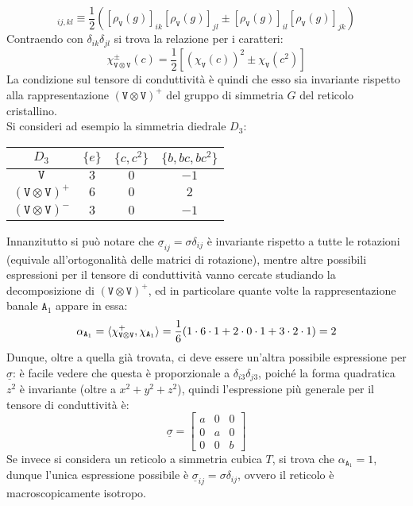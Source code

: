 \begin{equation}
	[\rho_{\mathtt{V} \otimes \mathtt{V}}^{\pm}(g)]_{ij,kl} \equiv \frac{1}{2} \left( [\rho_{\mathtt{V}}(g)]_{ik} [\rho_{\mathtt{V}}(g)]_{jl} \pm [\rho_{\mathtt{V}}(g)]_{il} [\rho_{\mathtt{V}}(g)]_{jk} \right)
	\label{eq:8.35}
\end{equation}
Contraendo con $ \delta_{ik} \delta_{jl} $ si trova la relazione per i caratteri:
\begin{equation}
	\chi_{\mathtt{V} \otimes \mathtt{V}}^{\pm}(c) = \frac{1}{2} \left[ (\chi_{\mathtt{V}}(c))^2 \pm \chi_{\mathtt{V}}(c^2) \right]
	\label{eq:8.36}
\end{equation}
La condizione sul tensore di conduttività è quindi che esso sia invariante rispetto alla rappresentazione $ (\mathtt{V} \otimes \mathtt{V})^+ $ del gruppo di simmetria $ G $ del reticolo cristallino.\\
Si consideri ad esempio la simmetria diedrale $ D_3 $:

\begin{table}[H]
	\centering
	\begin{tabular}{c|ccc}
		$ D_3 $ & $ \{e\} $ & $ \{c,c^2\} $ & $ \{b,bc,bc^2\} $ \\
		\hline
		$ \mathtt{V} $ & $ 3 $ & $ 0 $ & $ -1 $ \\
		$ \left( \mathtt{V} \otimes \mathtt{V} \right)^+ $ & $ 6 $ & $ 0 $ & $ 2 $ \\
		$ \left( \mathtt{V} \otimes \mathtt{V} \right)^- $ & $ 3 $ & $ 0 $ & $ -1 $
	\end{tabular}
\end{table}
Innanzitutto si può notare che $ \underline{\sigma}_{ij} = \sigma \delta_{ij} $ è invariante rispetto a tutte le rotazioni (equivale all'ortogonalità delle matrici di rotazione), mentre altre possibili espressioni per il tensore di conduttività vanno cercate studiando la decomposizione di $ \left( \mathtt{V} \otimes \mathtt{V} \right)^+ $, ed in particolare quante volte la rappresentazione banale $ \mathtt{A}_1 $ appare in essa:
\begin{equation*}
	\alpha_{\mathtt{A}_1} = \braket{\chi_{\mathtt{V} \otimes \mathtt{V}}^+, \chi_{\mathtt{A}_1}} = \frac{1}{6} (1 \cdot 6 \cdot 1 + 2 \cdot 0 \cdot 1 + 3 \cdot 2 \cdot 1) = 2
\end{equation*}
Dunque, oltre a quella già trovata, ci deve essere un'altra possibile espressione per $ \underline{\sigma} $: è facile vedere che questa è proporzionale a $ \delta_{i3} \delta_{j3} $, poiché la forma quadratica $ z^2 $ è invariante (oltre a $ x^2 + y^2 + z^2 $), quindi l'espressione più generale per il tensore di conduttività è:
\begin{equation*}
	\underline{\sigma} =
	\begin{bmatrix}
		a & 0 & 0 \\
		0 & a & 0 \\
		0 & 0 & b
	\end{bmatrix}
\end{equation*}
Se invece si considera un reticolo a simmetria cubica $ T $, si trova che $ \alpha_{\mathtt{A}_1} = 1 $, dunque l'unica espressione possibile è $ \underline{\sigma}_{ij} = \sigma \delta_{ij} $, ovvero il reticolo è macroscopicamente isotropo.

